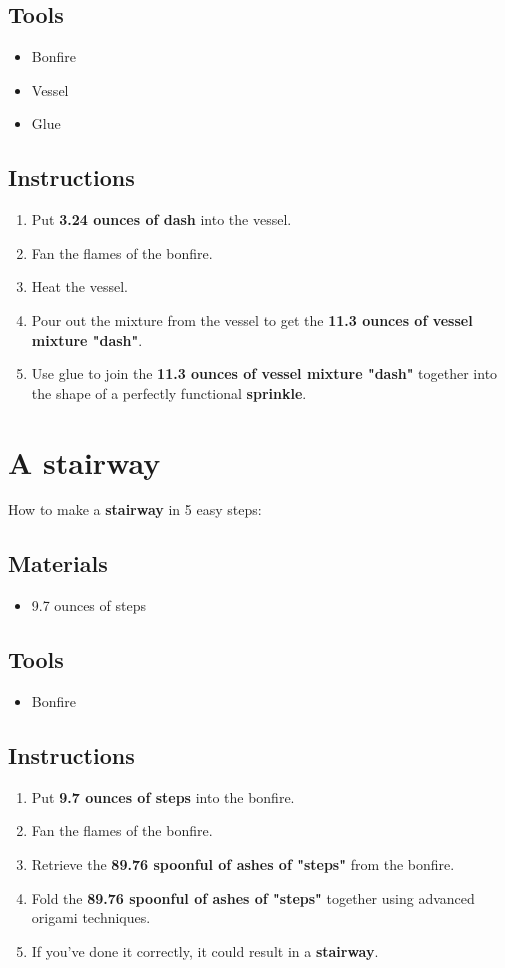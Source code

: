 \documentclass{article}
\begin{document}
\subsection{Tools}\begin{itemize}
\item 
Bonfire
\item 
Vessel
\item 
Glue
\end{itemize}
\subsection{Instructions}\begin{enumerate}
\item 
Put \textbf{3.24 ounces of dash} into the vessel.
\item 
Fan the flames of the bonfire.
\item 
Heat the vessel.
\item 
Pour out the mixture from the vessel to get the \textbf{11.3 ounces of vessel mixture "dash"}.
\item 
Use glue to join the \textbf{11.3 ounces of vessel mixture "dash"} together into the shape of a perfectly functional \textbf{sprinkle}.
\end{enumerate}
\newpage
\section{A stairway}How to make a \textbf{stairway} in 5 easy steps:

\subsection{Materials}\begin{itemize}
\item 
9.7 ounces of steps
\end{itemize}
\subsection{Tools}\begin{itemize}
\item 
Bonfire
\end{itemize}
\subsection{Instructions}\begin{enumerate}
\item 
Put \textbf{9.7 ounces of steps} into the bonfire.
\item 
Fan the flames of the bonfire.
\item 
Retrieve the \textbf{89.76 spoonful of ashes of "steps"} from the bonfire.
\item 
Fold the \textbf{89.76 spoonful of ashes of "steps"} together using advanced origami techniques.
\item 
If you've done it correctly, it could result in a \textbf{stairway}.
\end{enumerate}
\newpage
\end{document}
